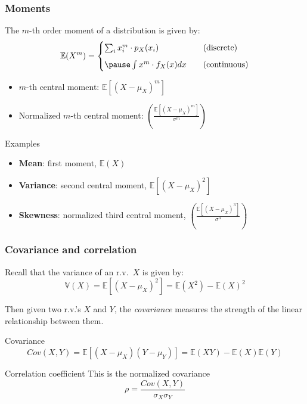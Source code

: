 \documentclass[usenames,dvipsnames,smaller]{beamer}
\newcommand{\lt}{\left}
\newcommand{\rt}{\right}
\newcommand{\?}{\stackrel{?}{=}}
\newcommand{\fr}{\frac}
\begin{document}
\begin{frame}
  \frametitle{Moments}
  \pause
  The $m$-th order moment of a distribution is given by: \pause
  \begin{equation}
    \mathbb{E}(X^{m}) =
    \begin{cases}
      \sum_{i}x_{i}^{m} \cdot p_{X}(x_{i}) & \quad \text{(discrete)} \\[2mm] \pause
      \int x^{m}\cdot f_{X}(x) dx & \quad \text{(continuous)}
    \end{cases}
  \end{equation}
  \pause

  \begin{itemize}[<+->]
  \item $m$-th central moment: $\mathbb{E}[(X - \mu_{X})^{m}]$
  \item Normalized $m$-th central moment: $\lt(\fr{\mathbb{E}[(X-\mu_{X})^{m}]}{\sigma^{m}}\rt)$
  \end{itemize}
  \pause

  \begin{exampleblock}{Examples}\pause
    \begin{itemize}
    \item \textbf{Mean}: first moment, \pause $\mathbb{E}(X)$ \pause
    \item \textbf{Variance}: second central moment, \pause $\mathbb{E}[(X-\mu_{X})^{2}]$\pause
    \item \textbf{Skewness}: normalized third central moment, \pause $\lt(\fr{\mathbb{E}[(X-\mu_{X})^{3}]}{\sigma^{3}}\rt)$
    \end{itemize}
  \end{exampleblock}
\end{frame}



\begin{frame}
  \frametitle{Covariance and correlation}
  Recall that the variance of an r.v.\ $X$ is given by:
  \begin{equation}
    \label{eq:52}
    \mathbb{V}(X) = \mathbb{E}[(X-\mu_X)^2 ] = \mathbb{E}(X^2) - \mathbb{E}(X)^2
  \end{equation}

  Then given two r.v.'s $X$ and $Y$, the {\it covariance} measures the strength of the linear relationship between them.
  \pause
  
  \begin{block}{Covariance}
    \begin{equation}
      \label{eq:50}
      Cov(X,Y) = \mathbb{E}[(X-\mu_X)(Y-\mu_Y)] = \mathbb{E}(XY) - \mathbb{E}(X)\mathbb{E}(Y)
    \end{equation}    
  \end{block}

\pause

  \begin{block}{Correlation coefficient}
    This is the normalized covariance
    \begin{equation}
    \label{eq:51}
    \rho = \fr{Cov(X,Y)}{\sigma_X\sigma_Y}
  \end{equation}
  \end{block}
    
\end{frame}
\end{document}
